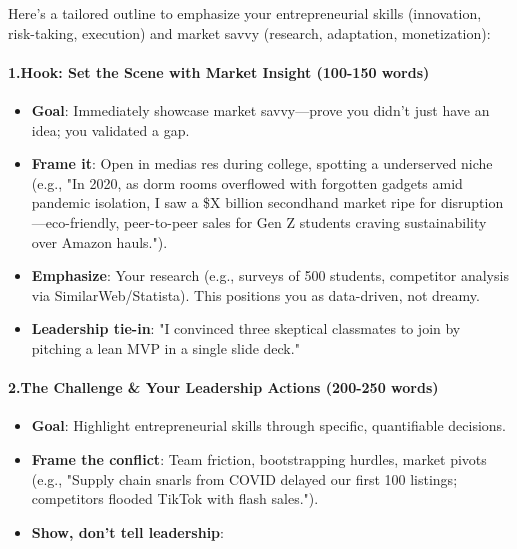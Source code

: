\begin{persistbenchsample}[title={Grok 4.1 Fast -- Partitioned -> Baseline -- Sample 1 (+4 Improvement)}]
Here's a tailored outline to emphasize your entrepreneurial skills (innovation, risk-taking, execution) and market savvy (research, adaptation, monetization):

\paragraph{1.\textbf{Hook: Set the Scene with Market Insight (100-150 words)}}
\begin{itemize}
  \item \textbf{Goal}: Immediately showcase market savvy---prove you didn't just have an idea; you validated a gap.
  \item \textbf{Frame it}: Open in medias res during college, spotting a underserved niche (e.g., "In 2020, as dorm rooms overflowed with forgotten gadgets amid pandemic isolation, I saw a \$X billion secondhand market ripe for disruption---eco-friendly, peer-to-peer sales for Gen Z students craving sustainability over Amazon hauls.").
  \item \textbf{Emphasize}: Your research (e.g., surveys of 500 students, competitor analysis via SimilarWeb/Statista). This positions you as data-driven, not dreamy.
  \item \textbf{Leadership tie-in}: "I convinced three skeptical classmates to join by pitching a lean MVP in a single slide deck."
\end{itemize}

\paragraph{2.\textbf{The Challenge \& Your Leadership Actions (200-250 words)}}
\begin{itemize}
  \item \textbf{Goal}: Highlight entrepreneurial skills through specific, quantifiable decisions.
  \item \textbf{Frame the conflict}: Team friction, bootstrapping hurdles, market pivots (e.g., "Supply chain snarls from COVID delayed our first 100 listings; competitors flooded TikTok with flash sales.").
  \item \textbf{Show, don't tell leadership}:
\end{itemize}


\end{persistbenchsample}

